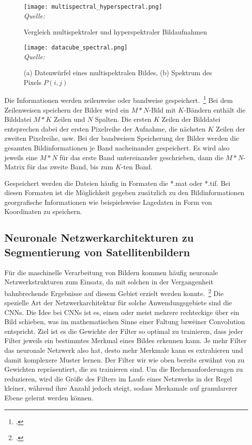 \begin{figure}[H]
    \caption {Vergleich multispektraler und hyperspektraler Bildaufnahmen}\label{fig:multispectral_hyperspectral}
    \texttt{[image: multispectral\_hyperspectral.png]}
    \\
    \textit{Quelle:~\cite[][]{ibraheem.2015}}
    \\
\end{figure}

\begin{figure}[H]
    \caption {(a) Datenwürfel eines multispektralen Bildes, (b) Spektrum des Pixels \(P(i,j)\)}
    \label{fig:datacube_multispectral}
    \texttt{[image: datacube\_spectral.png]}
    \\
    \textit{Quelle:~\cite[][]{ibraheem.2015}}
    \\
\end{figure}

Die Informationen werden zeilenweise oder bandweise gespeichert.~\footcite[\vglf][]{upadhyay.2012}
Bei dem Zeilenweisen speichern der Bilder wird ein \(M*N\)-Bild mit \(K\)-Bändern enthält die Bilddatei \(M*K\) Zeilen
und \(N\) Spalten.
Die ersten \(K\) Zeilen der Bilddatei entsprechen dabei der ersten Pixelreihe der Aufnahme, die nächsten \(K\) Zeilen
der zweiten Pixelreihe, usw.
Bei der bandweisen Speicherung der Bilder werden die gesamten Bildinformationen je Band nacheinander gespeichert.
Es wird also jeweils eine \(M*N\) für das erste Band untereinander geschrieben, dann die \(M*N\)-Matrix für das zweite
Band, bis zum \(K\)-ten Band.

Gespeichert werden die Dateien häufig in Formaten die *.mat oder *.tif.
Bei diesen Formaten ist die Möglichkeit gegeben zusätzlich zu den Bildinformationen georgrafische Informationen wie
beispielsweise Lagedaten in Form von Koordinaten zu speichern.

\subsection{Neuronale Netzwerkarchitekturen zu Segmentierung von Satellitenbildern}

Für die maschinelle Verarbeitung von Bildern kommen häufig neuronale Netzwerkstrukturen zum Einsatz, da mit solchen in
der Vergangenheit bahnbrechende Ergebnisse auf diesem Gebiet erzielt werden konnte.~\footcite[\vglf][]{pritt.2020}
Die spezielle Art der Netzwerkarchitektur für solche Anwendungsgebiete sind die \ac{CNN}s.
Die Idee bei \ac{CNN}s ist es, einen oder meist mehrere rechteckige \grqq über ein Bild schieben, was im
mathematischen Sinne einer Faltung bzw\. einer Convolution entspricht.
Ziel ist es die Gewichte der Filter so optimal zu trainieren, dass jeder Filter jeweils ein bestimmtes Merkmal eines Bildes
erkennen kann.
Je mehr Filter das neuronale Netzwerk also hat, desto mehr Merkmale kann es extrahieren und damit komplexere Muster lernen.
Der Filter wir wie oben bereits erwähnt von zu Gewichten repräsentiert, die zu trainieren sind.
Um die Rechenanforderungen zu reduzieren, wird die Größe des Filters im Laufe eines Netzwerks in der Regel kleiner,
während ihre Anzahl jedoch steigt, sodass Merkamale auf granularerer Ebene gelernt werden können.

